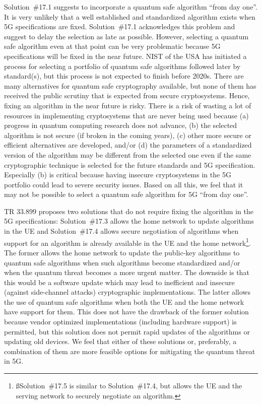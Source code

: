 \documentclass[lnicst,sechang,a4paper]{svmultln}
\begin{document}
Solution~\#17.1 suggests to incorporate a quantum safe algorithm ``from day one''. It is very unlikely that a well established and standardized algorithm exists when 5G specifications are fixed. Solution~\#17.1 acknowledges this problem and suggest to delay the selection as late as possible. However, selecting a quantum safe algorithm even at that point can be very problematic because 5G specifications will be fixed in the near future. NIST of the USA has initiated a process for selecting a portfolio of quantum safe algorithms followed later by standard(s), but this process is not expected to finish before 2020s. There are many alternatives for quantum safe cryptography available, but none of them has received the public scrutiny that is expected from secure cryptosystems. Hence, fixing an algorithm in the near future is risky. There is a risk of wasting a lot of resources in implementing cryptosystems that are never being used because (a) progress in quantum computing research does not advance, (b) the selected algorithm is not secure (if broken in the coming years), (c) other more secure or efficient alternatives are developed, and/or (d) the parameters of a standardized version of the algorithm may be different from the selected one even if the same cryptographic technique is selected for the future standards and 5G specification. Especially (b) is critical because having insecure cryptosystems in the 5G portfolio could lead to severe security issues. Based on all this, we feel that it may not be possible to select a quantum safe algorithm for 5G ``from day one''.

TR 33.899 proposes two solutions that do not require fixing the algorithm in the 5G specifications: Solution~\#17.3 allows the home network to update algorithms in the UE and Solution~\#17.4 allows secure negotiation of algorithms when support for an algorithm is already available in the UE and the home network\footnote{ßSolution~\#17.5 is similar to Solution~\#17.4, but allows the UE and the serving network to securely negotiate an algorithm.}. The former allows the home network to update the public-key algorithms to quantum safe algorithms when such algorithms become standardized and/or when the quantum threat becomes a more urgent matter. The downside is that this would be a software update which may lead to inefficient and insecure (against side-channel attacks) cryptographic implementations. The latter allows the use of quantum safe algorithms when both the UE and the home network have support for them. This does not have the drawback of the former solution because vendor optimized implementations (including hardware support) is permitted, but this solution does not permit rapid updates of the algorithms or updating old devices. We feel that either of these solutions or, preferably, a combination of them are more feasible options for mitigating the quantum threat in 5G.
\end{document}
